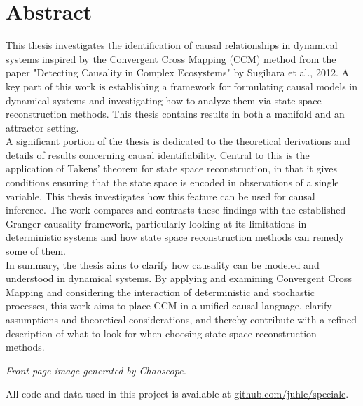 \documentclass[11pt, a4paper]{memoir}
\subtitle{Convergent Cross Mapping and Alternative Approaches}
\theoremstyle{break}
\theoremstyle{break}
\theoremstyle{nonumberplain}
\begin{document}
\begingroup
  \selectfont
  \maketitle
\endgroup
\frontmatter

\section*{Abstract}
This thesis investigates the identification of causal relationships in dynamical systems inspired by the Convergent Cross Mapping (CCM) method from the paper "Detecting Causality in Complex Ecosystems" by Sugihara et al., 2012. A key part of this work is establishing a framework for formulating causal models in dynamical systems and investigating how to analyze them via state space reconstruction methods. This thesis contains results in both a manifold and an attractor setting.\\
A significant portion of the thesis is dedicated to the theoretical derivations and details of results concerning causal identifiability. Central to this is the application of Takens' theorem for state space reconstruction, in that it gives conditions ensuring that the state space is encoded in observations of a single variable. This thesis investigates how this feature can be used for causal inference. The work compares and contrasts these findings with the established Granger causality framework, particularly looking at its limitations in deterministic systems and how state space reconstruction methods can remedy some of them.\\
In summary, the thesis aims to clarify how causality can be modeled and understood in dynamical systems. By applying and examining Convergent Cross Mapping and considering the interaction of deterministic and stochastic processes, this work aims to place CCM in a unified causal language, clarify assumptions and theoretical considerations, and thereby contribute with a refined description of what to look for when choosing state space reconstruction methods.

\vfill
\textit{Front page image generated by Chaoscope.}
\newpage


\tableofcontents


\vfill
\noindent All code and data used in this project is available at \url{github.com/juhlc/speciale}.
\end{document}
